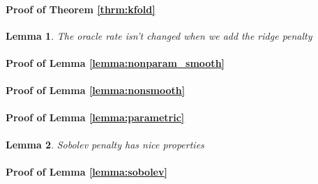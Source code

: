 \documentclass[12pt]{article}
\newtheorem{lemma}{Lemma}
\begin{document}
\paragraph{Proof of Theorem \ref{thrm:kfold}}

\begin{lemma}
\label{oracle_maintained}
The oracle rate isn't changed when we add the ridge penalty
\end{lemma}

\paragraph{Proof of Lemma \ref{lemma:nonparam_smooth}}
\paragraph{Proof of Lemma \ref{lemma:nonsmooth}}

\paragraph{Proof of Lemma \ref{lemma:parametric}}

\begin{lemma}
\label{lemma:sobolev_prop}
Sobolev penalty has nice properties
\end{lemma}

\paragraph{Proof of Lemma \ref{lemma:sobolev}}

\bigskip



\end{document}
